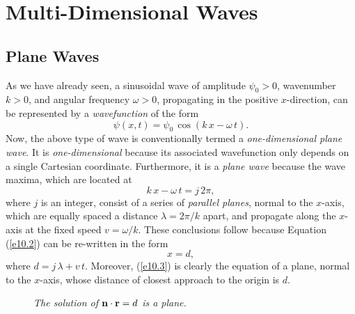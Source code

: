 \chapter{Multi-Dimensional Waves}
\section{Plane Waves}\label{s10.1}
As we have already seen, a sinusoidal wave of amplitude $\psi_0>0$, wavenumber $k>0$, and  angular frequency $\omega>0$, 
propagating in the positive $x$-direction,  can be  represented by a {\em wavefunction}\/ of the form
\begin{equation}\label{e10.1}
\psi(x,t)=\psi_0\,\cos(k\,x-\omega\,t).
\end{equation}
Now, the  above type of wave is conventionally termed  a {\em one-dimen\-sio\-nal plane wave}. It is {\em one-dimensional}\/
because its associated wavefunction only depends on a single Cartesian coordinate. 
Furthermore, it is a {\em plane wave}\/ because the wave maxima, which are located at
\begin{equation}\label{e10.2}
k\,x-\omega\,t  = j\,2\pi,
\end{equation}
where $j$ is an integer, consist of a series of {\em parallel planes},  normal to the $x$-axis, which are equally spaced a distance
$\lambda=2\pi/k$ apart, and propagate along the
$x$-axis at the fixed speed $v=\omega/k$. 
These conclusions follow because Equation (\ref{e10.2}) can be re-written in the form
\begin{equation}\label{e10.3}
x= d,
\end{equation}
where $d=j\,\lambda + v\,t$. Moreover, (\ref{e10.3})
is clearly the equation of a plane, normal to the $x$-axis,  whose distance of closest approach to the
origin is $d$. 

\begin{figure}
\epsfysize=2.5in
\centerline{}
\caption{\em The solution of ${\bf n}\cdot{\bf r} = d$ is a plane.}\label{f10.1}   
\end{figure}

